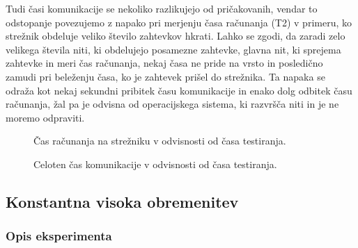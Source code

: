Tudi časi komunikacije se nekoliko razlikujejo od pričakovanih, vendar to odstopanje povezujemo z napako pri merjenju časa računanja (T2) v primeru, ko strežnik obdeluje veliko število zahtevkov hkrati.
Lahko se zgodi, da zaradi zelo velikega števila niti, ki obdelujejo posamezne zahtevke, glavna nit, ki sprejema zahtevke in meri čas računanja, nekaj časa ne pride na vrsto in posledično zamudi pri beleženju časa, ko je zahtevek prišel do strežnika.
Ta napaka se odraža kot nekaj sekundni pribitek času komunikacije in enako dolg odbitek času računanja, žal pa je odvisna od operacijskega sistema, ki razvršča niti in je ne moremo odpraviti.

\begin{figure}[H]
    \caption{Čas računanja na strežniku v odvisnosti od časa testiranja.}
    \label{fig:3_rezultati4_T2}
\end{figure}

\begin{figure}[H]
    \caption{Celoten čas komunikacije v odvisnosti od časa testiranja.}
    \label{fig:3_rezultati4_T1T3}
\end{figure}



\subsection{Konstantna visoka obremenitev} \label{3_konst_vis_obr}

\subsubsection{Opis eksperimenta}

